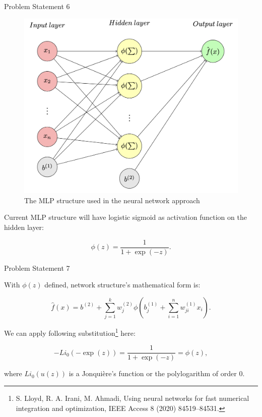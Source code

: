 \documentclass[9pt]{beamer}
\begin{document}
\begin{frame}{Problem Statement 6}

\begin{figure}[h!]
    \centering
    \includegraphics[width=0.4\linewidth]{structre-as-photo.png}
    \caption{The MLP structure used in the neural network approach}
    \label{fig:structure}
\end{figure}

Current MLP structure will have logistic sigmoid as activation function on the hidden layer:

\begin{equation}
    \label{eq:sigmoid}
    \phi(z) = \frac{1}{1+\exp(-z)}.
\end{equation}

\end{frame}

\begin{frame}{Problem Statement 7}

\noindent With $\phi(z)$ defined, network structure's mathematical form is:

\begin{equation}
    \label{eq:math-form-mlp}
    \hat{f}(x) = b^{(2)} + \sum_{j=1}^{k}w_j^{(2)}\phi(b_j^{(1)}+\sum_{i=1}^{n}w_{ji}^{(1)}x_{i}).
\end{equation}

We can apply following substitution\footnote{S. Lloyd, R. A. Irani, M. Ahmadi, Using neural networks for fast numerical integration and
optimization, IEEE Access 8 (2020) 84519–84531.} here:

\begin{equation}
    \label{eq:substitution-li-sigm}
    -Li_0(-\exp(z)) = \frac{1}{1+\exp(-z)} = \phi(z),
\end{equation}

\noindent where $Li_0(u(z))$ is a Jonquière's function or the polylogarithm of order 0.
    
\end{frame}
\end{document}
